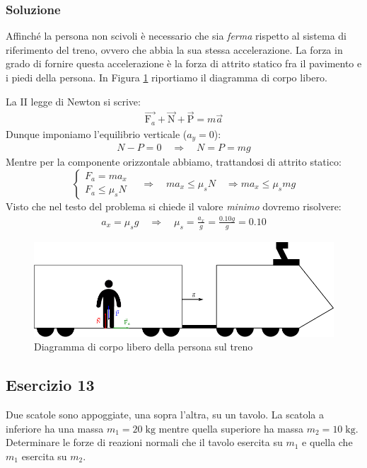 \documentclass[12pt,a4paper]{book}
\begin{document}
\subsubsection*{Soluzione}
Affinché la persona non scivoli è necessario che sia \textit{ferma} rispetto al sistema di riferimento del treno, ovvero che abbia la sua stessa accelerazione. La forza in grado di fornire questa accelerazione è la forza di attrito statico fra il pavimento e i piedi della persona. In Figura \ref{fig:4-e-13} riportiamo il diagramma di corpo libero.

La II legge di Newton si scrive:
%
\begin{gather*}
\vec{\text{F}_a}+\vec{\text{N}}+\vec{\text{P}}=m\vec{a}
\end{gather*}
%
Dunque imponiamo l'equilibrio verticale ($a_y=0$):
%
\begin{gather*}
N-P=0 \quad	\Longrightarrow \quad N=P=mg
\end{gather*}
%
Mentre per la componente orizzontale abbiamo, trattandosi di attrito statico:
%
\[
\begin{cases}
F_a=ma_x \quad\\ 
F_a\leq\mu_sN
\end{cases}
\Longrightarrow \quad  ma_x\leq\mu_sN \quad \Longrightarrow ma_x\leq\mu_smg
\]
%
Visto che nel testo del problema si chiede il valore \textit{minimo} dovremo risolvere:
%
\begin{gather*}
a_x=\mu_sg \quad \Longrightarrow \quad \mu_s=\frac{a_x}{g}=\frac{0.10g}{g}=0.10
\end{gather*}
%

\begin{figure}[!ht]
\centering
\includegraphics[scale=1.2]{e-13.pdf}
\caption{Diagramma di corpo libero della persona sul treno} 
\label{fig:4-e-13} 
\end{figure}





\pagebreak

\subsection*{Esercizio 13}
Due scatole sono appoggiate, una sopra l'altra, su un tavolo. La scatola a inferiore ha una massa $m_1=20\;\text{kg}$ mentre quella superiore ha massa $m_2=10\;\text{kg}$. Determinare le forze di reazioni normali che il tavolo esercita su $m_1$ e quella che $m_1$ esercita su $m_2$.
\end{document}
